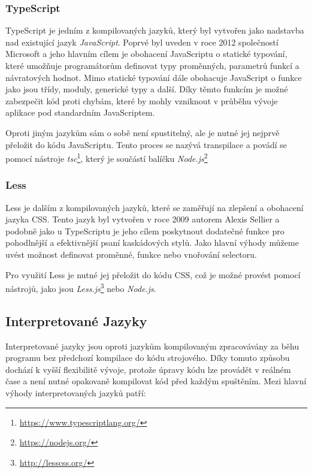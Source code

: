 \subsubsection*{TypeScript}
\label{subsubsec:languages-compiled-typescript}
TypeScript je jedním z kompilovaných jazyků, který byl vytvořen jako nadstavba nad existující jazyk \textit{JavaScript}. Poprvé byl uveden v roce 2012 společností Microsoft a jeho hlavním cílem je obohacení JavaScriptu o statické typování, které umožňuje programátorům definovat typy proměnných, parametrů funkcí a návratových hodnot. Mimo statické typování dále obohacuje JavaScript o funkce jako jsou třídy, moduly, generické typy a další. Díky těmto funkcím je možné zabezpečit kód proti chybám, které by mohly vzniknout v průběhu vývoje aplikace pod standardním JavaScriptem.

Oproti jiným jazykům sám o sobě není spustitelný, ale je nutné jej nejprvě přeložit do kódu JavaScriptu. Tento proces se nazývá transpilace a povádí se pomocí nástroje \textit{tsc}\footnote{\href{https://www.typescriptlang.org/}{https://www.typescriptlang.org/}}, který je součástí balíčku \textit{Node.js}\footnote{\href{https://nodejs.org/}{https://nodejs.org/}}

\subsubsection*{Less}
\label{subsubsec:languages-compiled-less}
Less je dalším z kompilovaných jazyků, které se zaměřují na zlepšení a obohacení jazyka CSS. Tento jazyk byl vytvořen v roce 2009 autorem Alexis Sellier a podobně jako u TypeScriptu je jeho cílem poskytnout dodatečné funkce pro pohodlnější a efektivnější psaní kaskádových stylů. Jako hlavní výhody můžeme uvést možnost definovat proměnné, funkce nebo vnořování selectoru.

Pro využití Less je nutné jej přeložit do kódu CSS, což je možné provést pomocí nástrojů, jako jsou \textit{Less.js}\footnote{\href{http://lesscss.org/}{http://lesscss.org/}} nebo \textit{Node.js}.

\subsection{Interpretované Jazyky}
\label{subsec:languages-interpreted}
Interpretované jazyky jsou oproti jazykům kompilovaným zpracovávány za běhu programu bez předchozí kompilace do kódu strojového. Díky tomuto způsobu dochází k vyšší flexibilitě vývoje, protože úpravy kódu lze provádět v reálném čase a není nutné opakovaně kompilovat kód před každým spuštěním. Mezi hlavní výhody interpretovaných jazyků patří:

